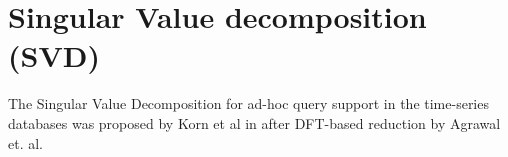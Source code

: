 \section{Singular Value decomposition (SVD)}
The Singular Value Decomposition for ad-hoc query support in the time-series databases was proposed by Korn et al in \cite{citeulike:4373332} after DFT-based reduction by Agrawal et. al. 